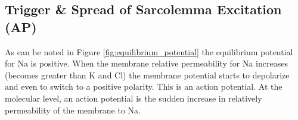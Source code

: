 
\subsection{Trigger \& Spread of Sarcolemma Excitation (AP)}

As can be noted in Figure \ref{fig:equilibrium_potential} the equilibrium potential for Na is positive. When the membrane relative permeability for Na increases (becomes greater than K and Cl) the membrane potential starts to depolarize and even to switch to a positive polarity. This is an action potential. At the molecular level, an action potential is the sudden increase in relatively permeability of the membrane to Na.  


